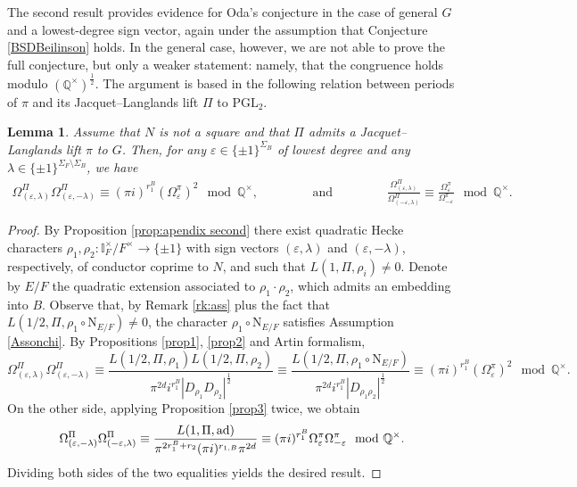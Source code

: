 \documentclass{amsart}
\newtheorem{lemma}[theorem]{Lemma}
\theoremstyle{definition}
\theoremstyle{remark}
\numberwithin{equation}{section}
\newcommand{\PGL}{{\mathrm{PGL}}}
\newcommand{\Q}{{\mathbb Q}}
\newcommand{\I}{{\mathbb I}}
\begin{document}
The second result provides evidence for Oda's conjecture in the case of general $G$ and a lowest-degree sign vector, again under the assumption that Conjecture \eqref{BSDBeilinson} holds. In the general case, however, we are not able to prove the full conjecture, but only a weaker statement: namely, that the congruence holds modulo $(\Q^\times)^{\frac{1}{2}}$. The argument is based in the following relation between periods of $\pi$ and its Jacquet--Langlands lift $\Pi$ to $\PGL_2$. 
\begin{lemma}\label{relperiodsPGLG}
  Assume that $N$ is not a square and that $\Pi$ admits a Jacquet--Langlands lift $\pi$ to $G$.  Then, for any $\varepsilon\in\{\pm 1\}^{\Sigma_B}$ of lowest degree and any $\lambda\in\{\pm 1\}^{\Sigma_F\setminus\Sigma_B}$, we have
  \begin{align*}
\Omega_{(\varepsilon,\lambda)}^\Pi\Omega_{(\varepsilon,-\lambda)}^\Pi\equiv(\pi i)^{r_1^B}(\Omega^{\pi}_{\varepsilon})^{2}\mod \Q^\times,\qquad\qquad \mbox{ and }\qquad\qquad
     \frac{\Omega_{(\varepsilon,\lambda)}^\Pi}{\Omega_{(-\varepsilon,\lambda)}^\Pi}\equiv\frac{\Omega^{\pi}_{\varepsilon}}{\Omega^{\pi}_{-\varepsilon}}\mod \Q^\times.
  \end{align*}
\end{lemma}
\begin{proof}
  By Proposition \ref{prop:apendix second} there exist quadratic Hecke characters $\rho_1,\rho_2:\I_F^\times/F^\times\rightarrow \{\pm 1\}$ with sign vectors $(\varepsilon,\lambda)$ and $(\varepsilon,-\lambda)$, respectively, of conductor coprime to $N$, and such that $L(1, \Pi, {\rho_i})\neq 0$. Denote by $E/F$ the quadratic extension associated to $\rho_1\cdot\rho_2$, which admits an embedding into $B$. Observe that, by Remark \ref{rk:ass} plus the fact that $L(1/2,\Pi, \rho_1\circ \mathrm{N}_{E/F})\neq 0$, the character $\rho_1\circ \mathrm{N}_{E/F}$ satisfies Assumption \ref{Assonchi}.
By Propositions \ref{prop1}, \ref{prop2} and Artin formalism,
\begin{equation*}
 \Omega_{(\varepsilon,\lambda)}^\Pi\Omega_{(\varepsilon,-\lambda)}^\Pi\equiv \frac{L(1/2,\Pi,\rho_1)L(1/2,\Pi,\rho_2)}{\pi^{2d} i^{r_1^B} |D_{\rho_1}D_{\rho_2}|^{\frac{1}{2}}}\equiv \frac{L(1/2,\Pi, \rho_1\circ \mathrm{N}_{E/F})}{\pi^{2d} i^{r_1^B} |D_{\rho_1\rho_2}|^{\frac{1}{2}}}\equiv(\pi i)^{r_1^B}(\Omega^{\pi}_{\varepsilon})^{2}\mod \Q^\times.
\end{equation*}
On the other side, applying  Proposition \ref{prop3} twice, we obtain
\begin{equation*}
 \Omega_{(\varepsilon,-\lambda)}^\Pi\Omega_{(-\varepsilon,\lambda)}^\Pi\equiv \frac{L(1,\Pi,{\rm ad})}{\pi^{2r_1^B+r_2}(\pi i)^{r_{1,B}}\pi^{2d} } \equiv(\pi i)^{r_1^B}\Omega^{\pi}_{\varepsilon}\Omega^{\pi}_{-\varepsilon}\mod \Q^\times.
\end{equation*}
Dividing both sides of the two equalities yields the desired result.
\end{proof}
\end{document}
